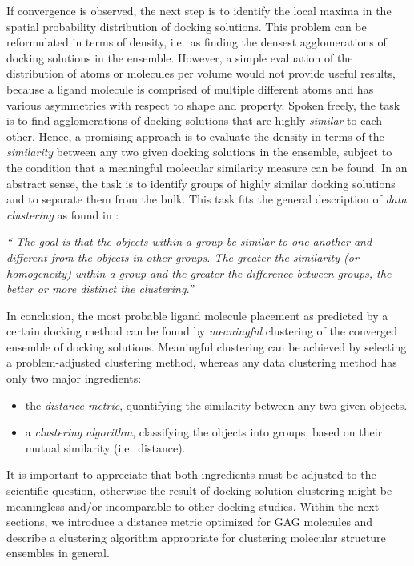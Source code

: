 If convergence is observed, the next step is to identify the local maxima in the
spatial probability distribution of docking solutions. This problem can be
reformulated in terms of density, i.e.\ as finding the densest agglomerations of
docking solutions in the ensemble. However, a simple evaluation of the
distribution of atoms or molecules per volume would not provide useful results,
because a ligand molecule is comprised of multiple different atoms and has
various asymmetries with respect to shape and property. Spoken freely, the task
is to find agglomerations of docking solutions that are highly \textit{similar}
to each other. Hence, a promising approach is to evaluate the density in terms
of the \textit{similarity} between any two given docking solutions in the
ensemble, subject to the condition that a meaningful molecular similarity
measure can be found. In an abstract sense, the task is to identify groups of
highly similar docking solutions and to separate them from the bulk. This task
fits the general description of \textit{data clustering} as found in
\cite{tan_data_mining}:

\begin{adjustwidth}{1.5cm}{1.5cm}
\textit{\enquote{
The goal is that the objects within a group be similar to one another and
different from the objects in other groups. The greater the similarity (or
homogeneity) within a group and the greater the difference between groups, the
better or more distinct the clustering.}}
\end{adjustwidth}

In conclusion, the most probable ligand molecule placement as predicted by a
certain docking method can be found by \textit{meaningful} clustering of the
converged ensemble of docking solutions. Meaningful clustering can be achieved
by selecting a problem-adjusted clustering method, whereas any data clustering
method has only two major ingredients:

\begin{itemize}
\item the \textit{distance metric}, quantifying the similarity between any two
given objects.
\item a \textit{clustering algorithm}, classifying the objects into groups,
based on their mutual similarity (i.e.\ distance).
\end{itemize}

It is important to appreciate that both ingredients must be adjusted to the
scientific question, otherwise the result of docking solution clustering might
be meaningless and/or incomparable to other docking studies. Within the next
sections, we introduce a distance metric optimized for GAG molecules and
describe a clustering algorithm appropriate for clustering molecular structure
ensembles in general.


